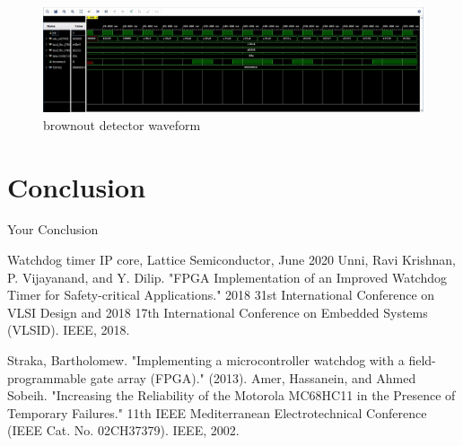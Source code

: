 \documentclass[10pt]{report}
\begin{document}
\begin{figure}[h]
\includegraphics[width=\textwidth,height=\textwidth,keepaspectratio]{Brownout_output.JPG}
\caption{brownout detector waveform}
\end{figure}


\newpage
\chapter{Conclusion}
Your Conclusion 
\newpage
\begin{thebibliography}{999}

\bibitem{} Watchdog timer IP core, Lattice Semiconductor, June 2020
\bibitem{} Unni, Ravi Krishnan, P. Vijayanand, and Y. Dilip. "FPGA Implementation of an Improved Watchdog Timer for Safety-critical Applications." 2018 31st International Conference on VLSI Design and 2018 17th International Conference on Embedded Systems (VLSID). IEEE, 2018.

\bibitem{} Straka, Bartholomew. "Implementing a microcontroller watchdog with a field-programmable gate array (FPGA)." (2013).
\bibitem{} Amer, Hassanein, and Ahmed Sobeih. "Increasing the Reliability of the Motorola MC68HC11 in the Presence of Temporary Failures." 11th IEEE Mediterranean Electrotechnical Conference (IEEE Cat. No. 02CH37379). IEEE, 2002.

\end{thebibliography}
\end{document}
